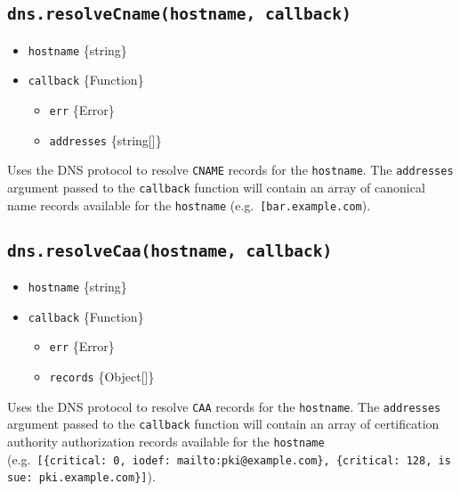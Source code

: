 \subsection{\texorpdfstring{\texttt{dns.resolveCname(hostname,\ callback)}}{dns.resolveCname(hostname, callback)}}\label{dns.resolvecnamehostname-callback}

\begin{itemize}
\tightlist
\item
  \texttt{hostname} \{string\}
\item
  \texttt{callback} \{Function\}

  \begin{itemize}
  \tightlist
  \item
    \texttt{err} \{Error\}
  \item
    \texttt{addresses} \{string{[}{]}\}
  \end{itemize}
\end{itemize}

Uses the DNS protocol to resolve \texttt{CNAME} records for the
\texttt{hostname}. The \texttt{addresses} argument passed to the
\texttt{callback} function will contain an array of canonical name
records available for the \texttt{hostname}
(e.g.~\texttt{{[}\textquotesingle{}bar.example.com\textquotesingle{}{]}}).

\subsection{\texorpdfstring{\texttt{dns.resolveCaa(hostname,\ callback)}}{dns.resolveCaa(hostname, callback)}}\label{dns.resolvecaahostname-callback}

\begin{itemize}
\tightlist
\item
  \texttt{hostname} \{string\}
\item
  \texttt{callback} \{Function\}

  \begin{itemize}
  \tightlist
  \item
    \texttt{err} \{Error\}
  \item
    \texttt{records} \{Object{[}{]}\}
  \end{itemize}
\end{itemize}

Uses the DNS protocol to resolve \texttt{CAA} records for the
\texttt{hostname}. The \texttt{addresses} argument passed to the
\texttt{callback} function will contain an array of certification
authority authorization records available for the \texttt{hostname}
(e.g.~\texttt{{[}\{critical:\ 0,\ iodef:\ \textquotesingle{}mailto:pki@example.com\textquotesingle{}\},\ \{critical:\ 128,\ issue:\ \textquotesingle{}pki.example.com\textquotesingle{}\}{]}}).

